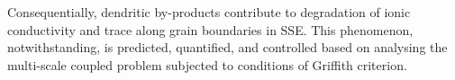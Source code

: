 \documentclass[25pt, a0paper,
portrait,
margin=5mm, innermargin=5mm, blockverticalspace=15mm, colspace=15mm, subcolspace=0mm]{tikzposter}
\begin{document}
\begin{columns}
{		Consequentially, dendritic by-products contribute to degradation of ionic conductivity
		and trace along grain boundaries in SSE. 
		This phenomenon, notwithstanding, is predicted, quantified, and controlled based on analysing 
		the multi-scale coupled problem subjected to conditions of Griffith criterion.
		
		
		
}
\end{columns}
\end{document}
